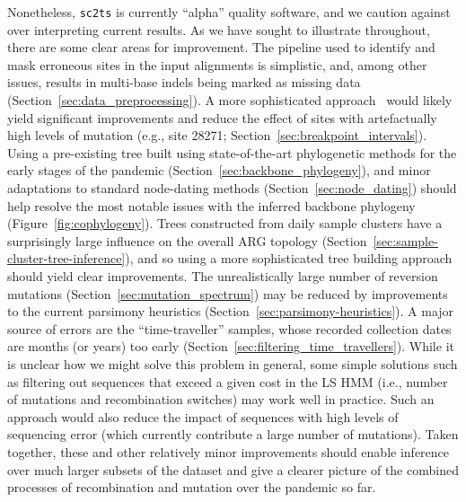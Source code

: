 \documentclass{article}
\begin{document}
Nonetheless, \texttt{sc2ts} is currently ``alpha'' quality software, and
we caution against over interpreting current results. As we have sought
to illustrate throughout, there are some clear areas for improvement.
The pipeline used to identify and
mask erroneous sites in the input alignments is simplistic, and, among
other issues, results in multi-base indels being marked as missing data
(Section~\ref{sec:data_preprocessing}). A more sophisticated
approach~\citep[e.g.,][]{Aksamentov2021-hj} would
likely yield significant improvements and reduce the effect of sites with
artefactually high levels of mutation (e.g., site 28271;
Section~\ref{sec:breakpoint_intervals}).
Using a pre-existing tree built using state-of-the-art phylogenetic methods
for the early stages of the pandemic (Section~\ref{sec:backbone_phylogeny}),
and minor adaptations to standard node-dating methods
(Section~\ref{sec:node_dating}) should help resolve the most notable issues with
the inferred backbone phylogeny (Figure~\ref{fig:cophylogeny}).
Trees constructed from daily sample clusters have a surprisingly large
influence on the overall ARG topology
(Section~\ref{sec:sample-cluster-tree-inference}), and so using a more
sophisticated tree building approach should yield clear improvements.
The unrealistically large number of reversion mutations
(Section~\ref{sec:mutation_spectrum}) may be reduced by
improvements to the current parsimony
heuristics (Section~\ref{sec:parsimony-heuristics}).
A major source of errors are the ``time-traveller'' samples, whose
recorded collection dates are months (or years) too early
(Section~\ref{sec:filtering_time_travellers}).
While it is unclear how
we might solve this problem in general, some simple solutions such
as filtering out sequences that exceed a given cost in the LS HMM
(i.e., number of mutations and recombination switches) may work well
in practice. Such an approach would also reduce the impact of sequences
with high levels of sequencing error (which currently contribute a large number of
mutations).
Taken together, these and other relatively minor improvements should
enable inference over much larger subsets of the dataset and
give a clearer picture of the combined processes of recombination and
mutation over the pandemic so far.
\end{document}
